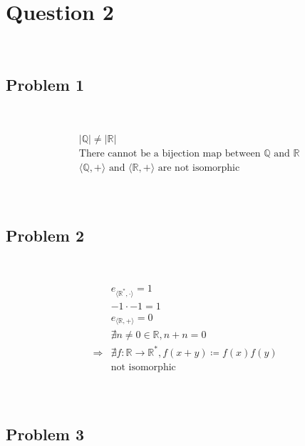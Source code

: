 \documentclass{article}
\begin{document}
\newpage

\section*{Question 2}

~

\subsection*{Problem 1}

~

\begin{equation*}
    \begin{split}
        &|\mathbb{Q} |\ne|\mathbb{R} |\\
        &\text{There cannot be a bijection map between }\mathbb{Q} \text{ and }\mathbb{R} \\
        &\langle\mathbb{Q} ,+\rangle\text{ and }\langle\mathbb{R} ,+\rangle\text{ are not isomorphic}\\
    \end{split}
\end{equation*}

~

\subsection*{Problem 2}

~

\begin{equation*}
    \begin{split}
        &e_{\langle\mathbb{R}^\ast,\cdot\rangle}=1\\
        &-1\cdot-1=1\\
        &e_{\langle\mathbb{R},+\rangle}=0\\
        &\nexists n\ne0\in \mathbb{R},n+n=0\\
        \Rightarrow&\nexists f:\mathbb{R} \rightarrow \mathbb{R} ^\ast ,f(x+y)\coloneqq f(x)f(y)\\
        &\text{not isomorphic}\\
    \end{split}
\end{equation*}

~

\subsection*{Problem 3}

~
\end{document}
